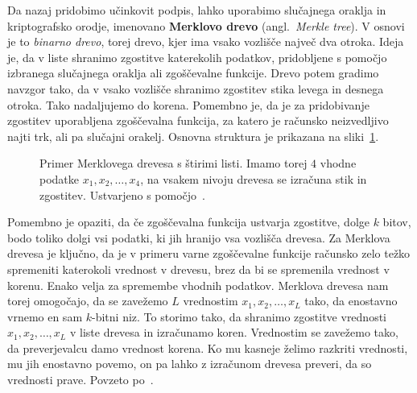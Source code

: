 Da nazaj pridobimo učinkovit podpis, lahko uporabimo slučajnega oraklja in kriptografsko
orodje, imenovano \textbf{Merklovo drevo} (angl.\ \textit{Merkle tree}). V osnovi je to
\textit{binarno drevo}, torej drevo, kjer ima vsako vozlišče največ dva otroka. Ideja je, da v liste
shranimo zgostitve katerekolih podatkov, pridobljene s pomočjo izbranega slučajnega oraklja ali zgoščevalne
funkcije. Drevo potem gradimo navzgor tako, da v vsako vozlišče shranimo zgostitev stika levega in desnega
otroka. Tako nadaljujemo do korena. Pomembno je, da je za pridobivanje zgostitev uporabljena zgoščevalna
funkcija, za katero je računsko neizvedljivo najti trk, ali pa slučajni orakelj. Osnovna
struktura je prikazana na sliki~\ref{fig:merkle}.
\begin{figure}[ht]
  \centering
  \caption[Merklovo drevo.]{Primer Merklovega drevesa s štirimi listi. Imamo torej $4$ vhodne podatke
    $x_1, x_2, \dots, x_4$, na vsakem nivoju drevesa se izračuna stik in zgostitev. Ustvarjeno s 
    pomočjo~\cite{SOtikz}.}
  \label{fig:merkle}
\end{figure}

Pomembno je opaziti, da če zgoščevalna funkcija ustvarja zgostitve, dolge $k$ bitov, bodo toliko
dolgi vsi podatki, ki jih hranijo vsa vozlišča drevesa. Za Merklova drevesa je ključno, da je v primeru
varne zgoščevalne funkcije računsko zelo težko spremeniti katerokoli vrednost v drevesu, brez da bi se
spremenila vrednost v korenu. Enako velja za spremembe vhodnih podatkov. Merklova drevesa nam torej
omogočajo, da se zavežemo $L$ vrednostim $x_1, x_2, \dots, x_L$ tako, da enostavno vrnemo en sam
$k$-bitni niz. To storimo tako, da shranimo zgostitve vrednosti $x_1, x_2, \dots, x_L$ v liste drevesa
in izračunamo koren. Vrednostim se zavežemo tako, da preverjevalcu damo vrednost korena. Ko mu kasneje
želimo razkriti vrednosti, mu jih enostavno povemo, on pa lahko z izračunom drevesa preveri, da so
vrednosti prave. Povzeto po~\cite{micali2000csproofs}.

